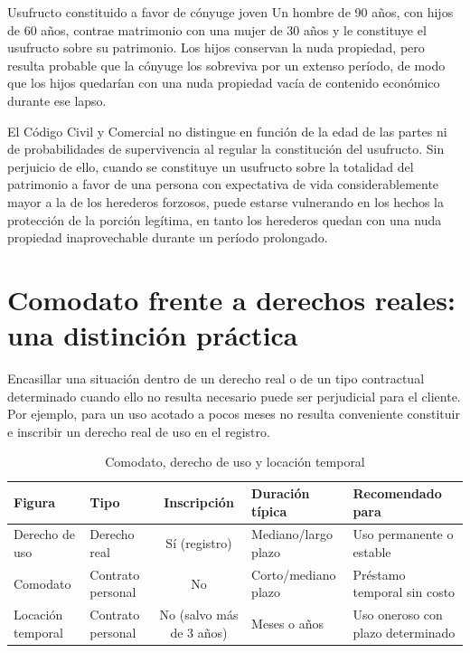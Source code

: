 \documentclass[12pt,oneside]{book}
\begin{document}
\begin{example}{Usufructo constituido a favor de cónyuge joven}
Un hombre de 90 años, con hijos de 60 años, contrae matrimonio con una mujer de 30 años y le constituye el usufructo sobre su patrimonio. Los hijos conservan la nuda propiedad, pero resulta probable que la cónyuge los sobreviva por un extenso período, de modo que los hijos quedarían con una nuda propiedad vacía de contenido económico durante ese lapso.
\end{example}

\begin{important}
El Código Civil y Comercial no distingue en función de la edad de las partes ni de probabilidades de supervivencia al regular la constitución del usufructo. Sin perjuicio de ello, cuando se constituye un usufructo sobre la totalidad del patrimonio a favor de una persona con expectativa de vida considerablemente mayor a la de los herederos forzosos, puede estarse vulnerando en los hechos la protección de la porción legítima, en tanto los herederos quedan con una nuda propiedad inaprovechable durante un período prolongado.
\end{important}

\section{Comodato frente a derechos reales: una distinción práctica}

Encasillar una situación dentro de un derecho real o de un tipo contractual determinado cuando ello no resulta necesario puede ser perjudicial para el cliente. Por ejemplo, para un uso acotado a pocos meses no resulta conveniente constituir e inscribir un derecho real de uso en el registro.

\begin{table}[H]
\centering
\caption{Comodato, derecho de uso y locación temporal}
\begin{tabularx}{\textwidth}{>{\raggedright\arraybackslash}X >{\raggedright\arraybackslash}X c >{\raggedright\arraybackslash}X >{\raggedright\arraybackslash}X}
\toprule
\textbf{Figura} & \textbf{Tipo} & \textbf{Inscripción} & \textbf{Duración típica} & \textbf{Recomendado para} \\
\midrule
Derecho de uso & Derecho real & Sí (registro) & Mediano/largo plazo & Uso permanente o estable \\
Comodato & Contrato personal & No & Corto/mediano plazo & Préstamo temporal sin costo \\
Locación temporal & Contrato personal & No (salvo más de 3 años) & Meses o años & Uso oneroso con plazo determinado \\
\bottomrule
\end{tabularx}
\end{table}
\end{document}
